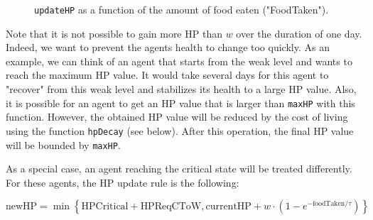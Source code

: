 \begin{figure}[htb]%
    \centering
    \qquad
    \caption{\texttt{updateHP} as a function of the amount of food eaten ("FoodTaken").}%
    \label{fig:updateHP}%
\end{figure}

Note that it is not possible to gain more HP than $w$ over the duration of one day. Indeed, we want to prevent the agents health to change too quickly. As an example, we can think of an agent that starts from the weak level and wants to reach the maximum HP value. It would take several days for this agent to "recover" from this weak level and stabilizes its health to a large HP value. Also, it is possible for an agent to get an HP value that is larger than \texttt{maxHP} with this function. However, the obtained HP value will be reduced by the cost of living using the function \texttt{hpDecay} (see below). After this operation, the final HP value will be bounded by \texttt{maxHP}.


As a special case, an agent reaching the critical state will be treated differently. For these agents, the HP update rule is the following:

\begin{equation}\label{updateHP_critical}
    \text{newHP} = \min\left\{\text{HPCritical}+\text{HPReqCToW}, \text{currentHP} +w\cdot(1-e^{-\text{foodTaken}/ \tau})\right\}
\end{equation}

